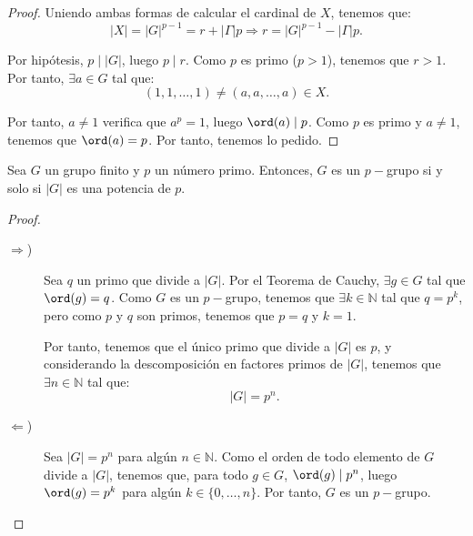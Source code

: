 \begin{ejercicio}
\begin{teo}[de Cauchy]
\begin{proof}
            Uniendo ambas formas de calcular el cardinal de \(X\), tenemos que:
            \begin{equation*}
                |X| = |G|^{p-1} = r + |\Gamma|p
                \Longrightarrow r= |G|^{p-1} - |\Gamma|p.
            \end{equation*}

            Por hipótesis, $p\mid |G|$, luego $p\mid r$. Como $p$ es primo ($p>1$), tenemos que $r>1$. Por tanto, $\exists a\in G$ tal que:
            \begin{equation*}
                (1,1,\ldots, 1) \neq (a, a, \ldots, a) \in X.
            \end{equation*}

            Por tanto, $a\neq 1$ verifica que $a^p = 1$, luego $\ord(a)\mid p$. Como \(p\) es primo y \(a\neq 1\), tenemos que \(\ord(a) = p\). Por tanto, tenemos lo pedido.
        \end{proof}
    \end{teo}
    \begin{coro}
        Sea \(G\) un grupo finito y $p$ un número primo. Entonces, \(G\) es un \(p-\)grupo si y solo si \(|G|\) es una potencia de \(p\).
        \begin{proof}~
            \begin{description}
                \item[$\Longrightarrow$)] Sea $q$ un primo que divide a \(|G|\). Por el Teorema de Cauchy, \(\exists g\in G\) tal que \(\ord(g) = q\). Como $G$ es un \(p-\)grupo, tenemos que \(\exists k\in \mathbb{N}\) tal que \(q = p^k\), pero como $p$ y \(q\) son primos, tenemos que \(p = q\) y $k=1$.
                
                Por tanto, tenemos que el único primo que divide a \(|G|\) es \(p\), y considerando la descomposición en factores primos de \(|G|\), tenemos que $\exists n\in \mathbb{N}$ tal que:
                \begin{equation*}
                    |G| = p^n.
                \end{equation*}

                \item[$\Longleftarrow$)] Sea \(|G| = p^n\) para algún \(n\in \mathbb{N}\). Como el orden de todo elemento de \(G\) divide a \(|G|\), tenemos que, para todo \(g\in G\), \(\ord(g)\mid p^n\), luego \(\ord(g) = p^k\) para algún \(k\in \{0, \ldots, n\}\). Por tanto, \(G\) es un \(p-\)grupo.
            \end{description}
        \end{proof}
    \end{coro}
\end{ejercicio}

